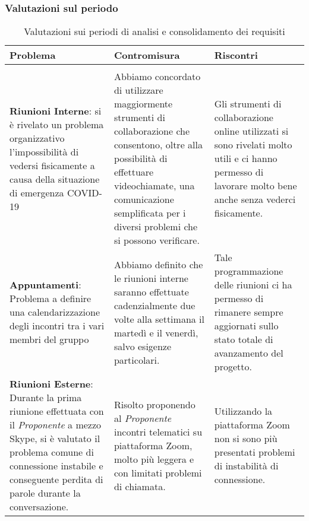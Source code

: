 		\subsubsection{Valutazioni sul periodo}
			\begin{longtable}{ 
				>{\centering}p{}
				>{\centering}p{}
				>{\centering\arraybackslash}p{}}
		
				\caption {Valutazioni sui periodi di analisi e consolidamento dei requisiti}		\\
		
				\textbf{\color{white}Problema} &
				\textbf{\color{white}Contromisura} &
				\textbf{\color{white}Riscontri}
				\tabularnewline  
				\endhead
		
				\multicolumn{3}{c}{Organizzazione} \\
				\textbf{Riunioni Interne}: si è rivelato un problema organizzativo l'impossibilità di vedersi fisicamente a causa della situazione di emergenza COVID-19\ped{\textit{G}}
					&
				Abbiamo concordato di utilizzare maggiormente strumenti di collaborazione che consentono, oltre alla possibilità di effettuare videochiamate, una comunicazione semplificata per i diversi problemi che si possono verificare.
					&
				Gli strumenti di collaborazione online utilizzati si sono rivelati molto utili e ci hanno permesso di lavorare molto bene anche senza vederci fisicamente.
					\\
	
				\textbf{Appuntamenti}: Problema a definire una calendarizzazione degli incontri tra i vari membri del gruppo
					&
				Abbiamo definito che le riunioni interne saranno effettuate cadenzialmente due volte alla settimana il martedì e il venerdì, salvo esigenze particolari.
					&
				Tale programmazione delle riunioni ci ha permesso di rimanere sempre aggiornati sullo stato totale di avanzamento del progetto.
					\\
		
				\textbf{Riunioni Esterne}: Durante la prima riunione effettuata con il \textit{Proponente}\ped{\textit{G}} a mezzo Skype\ped{\textit{G}}, si è valutato il problema comune di connessione instabile e conseguente perdita di parole durante la conversazione.
					&
				Risolto proponendo al \textit{Proponente}\ped{\textit{G}}	incontri telematici su piattaforma Zoom\ped{\textit{G}}, molto più leggera e con limitati problemi di chiamata.
					&
				Utilizzando la piattaforma Zoom\ped{\textit{G}} non si sono più presentati problemi di instabilità di connessione.
					\\
				

\end{longtable}
